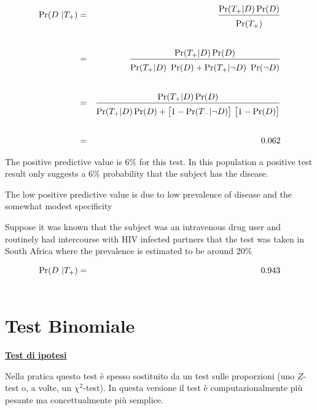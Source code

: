 \documentclass[12pt,openany]{book}
\theoremstyle{mio}
\theoremstyle{liscio}
\begin{document}
\begin{eqnarray*}
\Pr(D ~|T_+)& = &\frac{\Pr(T_+|D)\Pr(D)}{\Pr(T_+)\vphantom{\Big[}}\\ \\
& = &\frac{\Pr(T_+|D)\Pr(D)}{\Pr(T_+|D)\ \Pr(D) + \Pr(T_+|\neg D)\ \Pr(\neg D)\vphantom{\Big[}}\\ \\
& = & \frac{\Pr(T_+|D)\Pr(D)}{\Pr(T_+|D)\Pr(D) + \big[1-\Pr(T_-|\neg D)\big]\ \big[1 - \Pr(D)\big]\vphantom{\Big[}} \\ \\
& = & 0.062
\end{eqnarray*}

The {\color{violet}positive predictive value is 6\%} for this test. In this population a positive test result only suggests a 6\% probability that the subject has the disease. 


The low positive predictive value is due to low prevalence of disease and the
somewhat modest specificity 

Suppose it was known that the subject was an intravenous drug user and routinely had intercourse with HIV infected partners that the test was taken in South Africa where the prevalence is estimated to be around 20\%

\begin{eqnarray*}
\Pr(D ~|T_+)& = & 0.943\\
& \hphantom{=} & \hphantom{\frac{\Pr(T_+|D)\Pr(D)}{\Pr(T_+|D)\Pr(D) + \big[1-\Pr(T_-|\neg D)\big]\ \big[1 - \Pr(D)\big]\vphantom{\Big[}}}
\end{eqnarray*}


\hfill{}\clearpage\section{Test Binomiale}
\hfill\textbf{{\color{brown}\hyperref[test_ipotesi]{Test di ipotesi \faShare}}}

\def\medrel#1{\parbox[t]{6ex}{$\displaystyle\hfil #1$}}
\def\ceq#1#2#3{\parbox[t]{15ex}{$\displaystyle #1$}\medrel{#2}$\displaystyle  #3$}

Nella pratica questo test è spesso sostituito da un test sulle proporzioni (uno $Z$-test o, a volte, un $\chi^2$-test). In questa versione il test è computazionalmente più pesante ma concettualmente più semplice.
\end{document}
